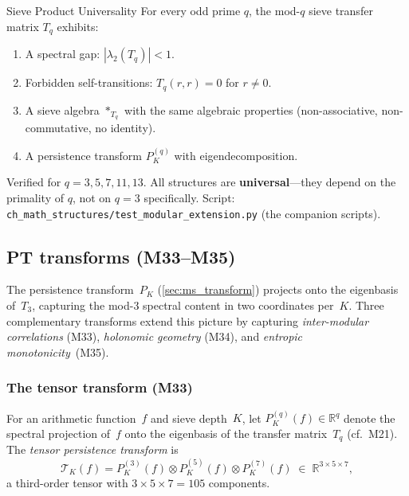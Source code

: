 \documentclass[12pt,a4paper]{article}
\begin{document}
\begin{thmbox}{Sieve Product Universality}
\label{thm:universality}
For every odd prime $q$, the mod-$q$ sieve transfer matrix $T_q$
exhibits:
\begin{enumerate}[nosep]
\item A spectral gap: $|\lambda_2(T_q)| < 1$.
\item Forbidden self-transitions: $T_q(r, r) = 0$ for $r \neq 0$.
\item A sieve algebra $*_{T_q}$ with the same algebraic properties
  (non-associative, non-commutative, no identity).
\item A persistence transform $P_K^{(q)}$ with eigendecomposition.
\end{enumerate}
Verified for $q = 3, 5, 7, 11, 13$. All structures are
\textbf{universal}---they depend on the primality of $q$, not on
$q = 3$ specifically.
Script: \texttt{ch\_math\_structures/test\_modular\_extension.py} (the companion scripts).
\end{thmbox}


\subsection{PT transforms (M33--M35)}
\label{sec:ms_new_transforms}

The persistence transform~$P_K$ (\cref{sec:ms_transform}) projects
onto the eigenbasis of~$T_3$, capturing the mod-3 spectral content
in two coordinates per~$K$.  Three complementary transforms extend
this picture by capturing \emph{inter-modular correlations} (M33),
\emph{holonomic geometry} (M34), and \emph{entropic monotonicity}~(M35).


\subsubsection{The tensor transform (M33)}
\label{sec:ms_tensor_transform}

\begin{definition}
\label{def:tensor_transform}
For an arithmetic function~$f$ and sieve depth~$K$, let
$P_K^{(q)}(f) \in \mathbb{R}^q$ denote the spectral projection
of~$f$ onto the eigenbasis of the transfer matrix~$T_q$
(cf.~M21).  The \emph{tensor persistence transform} is
\begin{equation}
  \mathcal{T}_K(f)
  = P_K^{(3)}(f) \otimes P_K^{(5)}(f) \otimes P_K^{(7)}(f)
  \;\in\; \mathbb{R}^{3 \times 5 \times 7},
  \label{eq:tensor_transform}
\end{equation}
a third-order tensor with $3 \times 5 \times 7 = 105$ components.
\end{definition}
\end{document}
